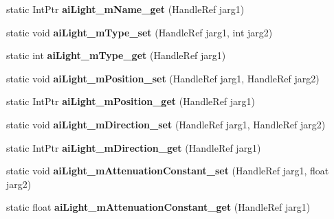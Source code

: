 \begin{DoxyCompactItemize}
\item 
\hypertarget{class_assimp_p_i_n_v_o_k_e_a0e0c42864fffc79adc83f5df514cb214}{static Int\+Ptr {\bfseries ai\+Light\+\_\+m\+Name\+\_\+get} (Handle\+Ref jarg1)}\label{class_assimp_p_i_n_v_o_k_e_a0e0c42864fffc79adc83f5df514cb214}

\item 
\hypertarget{class_assimp_p_i_n_v_o_k_e_a83be3681ca57ba2d80f52ef1182148f4}{static void {\bfseries ai\+Light\+\_\+m\+Type\+\_\+set} (Handle\+Ref jarg1, int jarg2)}\label{class_assimp_p_i_n_v_o_k_e_a83be3681ca57ba2d80f52ef1182148f4}

\item 
\hypertarget{class_assimp_p_i_n_v_o_k_e_ad55875e41a99d4577b0115a40e33675a}{static int {\bfseries ai\+Light\+\_\+m\+Type\+\_\+get} (Handle\+Ref jarg1)}\label{class_assimp_p_i_n_v_o_k_e_ad55875e41a99d4577b0115a40e33675a}

\item 
\hypertarget{class_assimp_p_i_n_v_o_k_e_ab731a54dd23a63f3b3448d2bca75acba}{static void {\bfseries ai\+Light\+\_\+m\+Position\+\_\+set} (Handle\+Ref jarg1, Handle\+Ref jarg2)}\label{class_assimp_p_i_n_v_o_k_e_ab731a54dd23a63f3b3448d2bca75acba}

\item 
\hypertarget{class_assimp_p_i_n_v_o_k_e_a38d0443c59d1b8dcd00760d6d8f2cdd6}{static Int\+Ptr {\bfseries ai\+Light\+\_\+m\+Position\+\_\+get} (Handle\+Ref jarg1)}\label{class_assimp_p_i_n_v_o_k_e_a38d0443c59d1b8dcd00760d6d8f2cdd6}

\item 
\hypertarget{class_assimp_p_i_n_v_o_k_e_a058cf35d9f69061565d127c8986fb9a0}{static void {\bfseries ai\+Light\+\_\+m\+Direction\+\_\+set} (Handle\+Ref jarg1, Handle\+Ref jarg2)}\label{class_assimp_p_i_n_v_o_k_e_a058cf35d9f69061565d127c8986fb9a0}

\item 
\hypertarget{class_assimp_p_i_n_v_o_k_e_a6533bd9112ce07c26ad9aed56e503ec3}{static Int\+Ptr {\bfseries ai\+Light\+\_\+m\+Direction\+\_\+get} (Handle\+Ref jarg1)}\label{class_assimp_p_i_n_v_o_k_e_a6533bd9112ce07c26ad9aed56e503ec3}

\item 
\hypertarget{class_assimp_p_i_n_v_o_k_e_a3a577ca7bbf95a8ef80648170be1b2ad}{static void {\bfseries ai\+Light\+\_\+m\+Attenuation\+Constant\+\_\+set} (Handle\+Ref jarg1, float jarg2)}\label{class_assimp_p_i_n_v_o_k_e_a3a577ca7bbf95a8ef80648170be1b2ad}

\item 
\hypertarget{class_assimp_p_i_n_v_o_k_e_a832765c03a0838a95f5461ef374c4bce}{static float {\bfseries ai\+Light\+\_\+m\+Attenuation\+Constant\+\_\+get} (Handle\+Ref jarg1)}\label{class_assimp_p_i_n_v_o_k_e_a832765c03a0838a95f5461ef374c4bce}


\end{DoxyCompactItemize}
